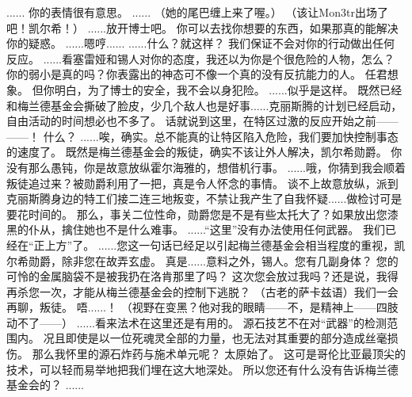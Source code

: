 \documentclass[openany]{book}
\begin{document}
\begin{dialogue}
     ......
     你的表情很有意思。
     ......
     （她的尾巴缠上来了喔。）
     （该让Mon3tr出场了吧！凯尔希！）
     ......放开博士吧。
     你可以去找你想要的东西，如果那真的能解决你的疑惑。
     ......嗯哼......
     ......什么？就这样？
     我们保证不会对你的行动做出任何反应。
     ......看塞雷娅和锡人对你的态度，我还以为你是个很危险的人物，怎么？
     你的弱小是真的吗？你表露出的神态可不像一个真的没有反抗能力的人。
     任君想象。
     但你明白，为了博士的安全，我不会以身犯险。
     ......似乎是这样。
     既然已经和梅兰德基金会撕破了脸皮，少几个敌人也是好事......克丽斯腾的计划已经启动，自由活动的时间想必也不多了。
     话就说到这里，在特区过激的反应开始之前——
     ——！
     什么？
     ......唉，确实。总不能真的让特区陷入危险，我们要加快控制事态的速度了。
     既然是梅兰德基金会的叛徒，确实不该让外人解决，凯尔希勋爵。
     你没有那么愚钝，你是故意放纵霍尔海雅的，想借机行事。
     ......哦，你猜到我会顺着叛徒追过来？被勋爵利用了一把，真是令人怀念的事情。
     谈不上故意放纵，派到克丽斯腾身边的特工们接二连三地叛变，不禁让我产生了自我怀疑......做检讨可是要花时间的。
     那么，事关二位性命，勋爵您是不是有些太托大了？如果放出您漆黑的仆从，擒住她也不是什么难事。
     ......“这里”没有办法使用任何武器。
     我们已经在“正上方”了。
     ......您这一句话已经足以引起梅兰德基金会相当程度的重视，凯尔希勋爵，除非您在故弄玄虚。
     真是......意料之外，锡人。您有几副身体？
     您的可怜的金属脑袋不是被我扔在洛肯那里了吗？
     这次您会放过我吗？还是说，我得再杀您一次，才能从梅兰德基金会的控制下逃脱？
     （古老的萨卡兹语）我们一会再聊，叛徒。
     唔......！
     （视野在变黑？他对我的眼睛——不，是精神上——四肢动不了——）
     ......看来法术在这里还是有用的。
     源石技艺不在对“武器”的检测范围内。
     况且即使是以一位死魂灵全部的力量，也无法对其重要的部分造成丝毫损伤。
     那么我怀里的源石炸药与施术单元呢？
     太原始了。
     这可是哥伦比亚最顶尖的技术，可以轻而易举地把我们埋在这大地深处。
     所以您还有什么没有告诉梅兰德基金会的？
     ......

\end{dialogue}
\end{document}
